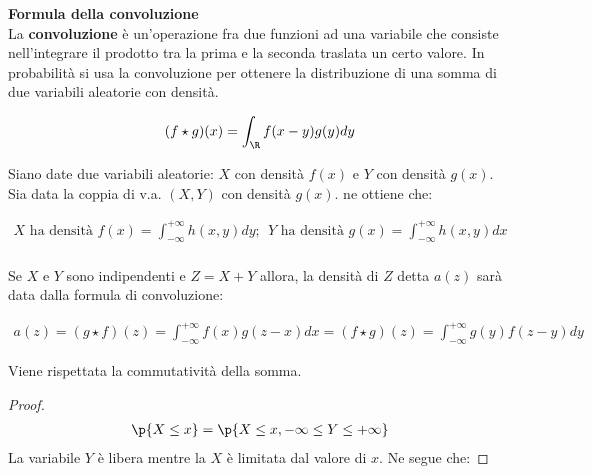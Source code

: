 \begin{defn}
    \textbf{Formula della convoluzione} \\
    La \textbf{convoluzione} è un'operazione fra due funzioni ad una variabile
    che consiste nell'integrare il prodotto tra la prima e la seconda traslata
    un certo valore. In probabilità si usa la convoluzione per ottenere la
    distribuzione di una somma di due variabili aleatorie con densità.

    \begin{equation*}
        \begin{aligned}
            (f \star g)(x) = \int_{\R}f(x - y)g(y) dy
        \end{aligned}
    \end{equation*}

    Siano date due variabili aleatorie: $X$ con densità $f(x)$ e $Y$ con densità
    $g(x)$. Sia data la coppia di v.a. $(X, Y)$ con densità $g(x)$. ne ottiene
    che:

    \begin{equation*}
        \begin{aligned}
            X \text{ ha densità } f(x) = \int_{-\infty}^{+\infty} h(x,y) dy; \>\>
            Y \text{ ha densità } g(x) = \int_{-\infty}^{+\infty} h(x,y) dx \\
        \end{aligned}
    \end{equation*}

    Se $X$ e $Y$ sono indipendenti e $Z = X + Y$ allora, la densità di $Z$ detta
    $a(z)$ sarà data dalla formula di convoluzione:

    \begin{equation*}
        \begin{aligned}
            a(z) = (g \star f)(z) = \int_{-\infty}^{+\infty} f(x) g(z-x) dx = (f \star g)(z) = \int_{-\infty}^{+\infty} g(y) f(z-y) dy
        \end{aligned}
    \end{equation*}

    Viene rispettata la commutatività della somma.

    \begin{proof}
        \begin{equation*}
            \begin{aligned}
                \p{X \leq x} = \p{X \leq x, -\infty \leq Y \leq +\infty}
            \end{aligned}
        \end{equation*}
        La variabile $Y$ è libera mentre la $X$ è limitata dal valore di $x$. Ne
        segue che:


\end{proof}
\end{defn}
